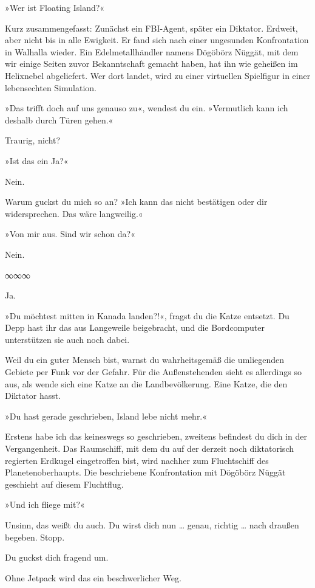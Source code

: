 »Wer ist Floating Island?«

Kurz zusammengefasst: Zunächst ein FBI-Agent, später ein Diktator. Erdweit, aber nicht bis in alle Ewigkeit. Er fand sich nach einer ungesunden Konfrontation in Walhalla wieder. Ein Edelmetallhändler namens Dögöbörz Nüggät, mit dem wir einige Seiten zuvor Bekanntschaft gemacht haben, hat ihn wie geheißen im Helixnebel abgeliefert. Wer dort landet, wird zu einer virtuellen Spielfigur in einer lebensechten Simulation.

»Das trifft doch auf uns genauso zu«, wendest du ein. »Vermutlich kann ich deshalb durch Türen gehen.«

Traurig, nicht?

»Ist das ein Ja?«

Nein.

Warum guckst du mich so an? »Ich kann das nicht bestätigen oder dir widersprechen. Das wäre langweilig.«

»Von mir aus. Sind wir schon da?«

Nein.

\begin{center}
∞∞∞
\end{center}

Ja.

»Du möchtest mitten in Kanada landen?!«, fragst du die Katze entsetzt. Du Depp hast ihr das aus Langeweile beigebracht, und die Bordcomputer unterstützen sie auch noch dabei.

Weil du ein guter Mensch bist, warnst du wahrheitsgemäß die umliegenden Gebiete per Funk vor der Gefahr. Für die Außenstehenden sieht es allerdings so aus, als wende sich eine Katze an die Landbevölkerung. Eine Katze, die den Diktator hasst.

»Du hast gerade geschrieben, Island lebe nicht mehr.«

Erstens habe ich das keineswegs so geschrieben, zweitens befindest du dich in der Vergangenheit. Das Raumschiff, mit dem du auf der derzeit noch diktatorisch regierten Erdkugel eingetroffen bist, wird nachher zum Fluchtschiff des Planetenoberhaupts. Die beschriebene Konfrontation mit Dögöbörz Nüggät geschieht auf diesem Fluchtflug.

»Und ich fliege mit?«

Unsinn, das weißt du auch. Du wirst dich nun … genau, richtig … nach draußen begeben. Stopp.

Du guckst dich fragend um.

Ohne Jetpack wird das ein beschwerlicher Weg.

